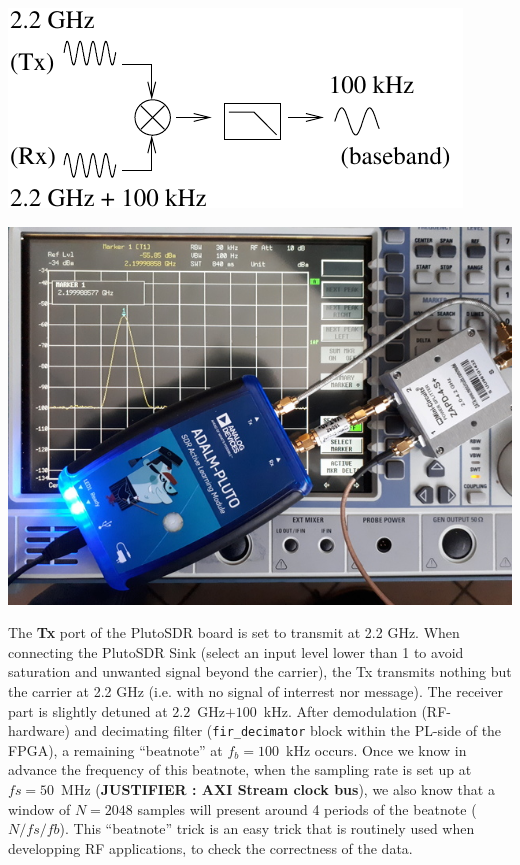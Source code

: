 \documentclass{article}
\begin{document}
\begin{minipage}[c]{0.49\linewidth}
	\includegraphics[width=\linewidth]{beatnote_pluto_scheme.pdf}
\end{minipage}\hfill
\begin{minipage}[c]{0.49\linewidth}
	\includegraphics[width=\linewidth]{20190213_105039_640.jpg}
\end{minipage}

The {\bf Tx} port of the PlutoSDR board is set to transmit at 2.2 GHz. When connecting
the PlutoSDR Sink (select an input level lower than 1 to avoid saturation and 
unwanted signal beyond the carrier), the Tx transmits nothing but the carrier at 2.2 GHz 
(i.e. with no signal of interrest nor message). The receiver part is slightly detuned at 
$2.2$~GHz$+100$~kHz. After demodulation (RF-hardware) and decimating filter ({\tt fir\_decimator}
block within the PL-side of the FPGA), a remaining ``beatnote'' at $f_b=100$~kHz occurs.
Once we know in advance the frequency of this beatnote, when the sampling rate
is set up at $fs=50$~MHz ({\bf JUSTIFIER : AXI Stream clock bus}), we also know that a window 
of $N=2048$ samples will present around 4 periods of the beatnote ($N/fs/fb$).
This ``beatnote'' trick is  an easy trick that is routinely used when developping
RF applications, to check the correctness of the data.
\end{document}
